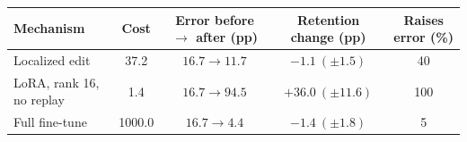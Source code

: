 \begin{tabular}{lcccc}
\toprule
Mechanism & Cost & Error before $\to$ after (pp) & Retention change (pp) & Raises error (\%)\\
\midrule
Localized edit & 37.2 & $16.7\to11.7$ & $-1.1\ (\pm1.5)$ & 40\\
LoRA, rank 16, no replay & 1.4 & $16.7\to94.5$ & $+36.0\ (\pm11.6)$ & 100\\
Full fine-tune & 1000.0 & $16.7\to4.4$ & $-1.4\ (\pm1.8)$ & 5\\
\bottomrule
\end{tabular}
